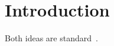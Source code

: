 \documentclass{article}
\begin{document}
\begin{abstract}
Attention replaces recurrence~\cite{vaswani2017attention}; residual connections ease
optimisation~\cite{he2016resnet}.
\end{abstract}
\section{Introduction}
Both ideas are standard~\cite{vaswani2017attention,he2016resnet}.
\end{document}
